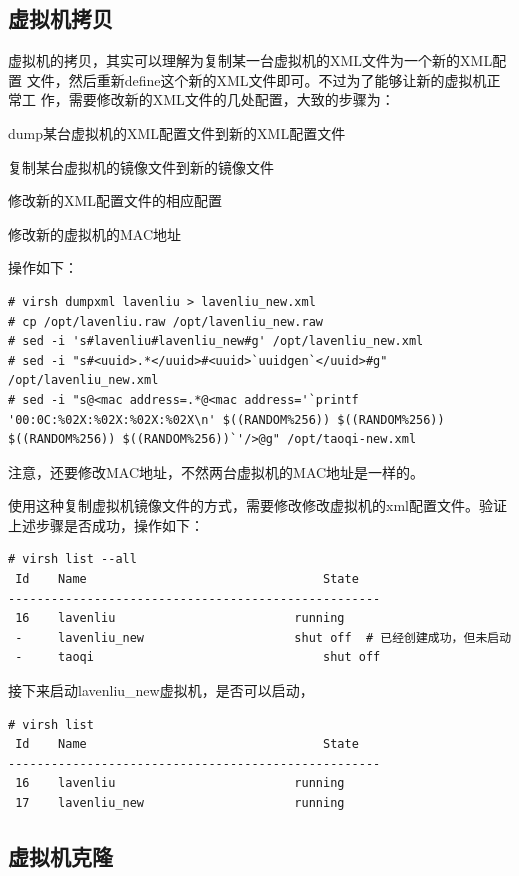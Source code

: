 \subsection{虚拟机拷贝}
\label{sec:copyVM}

虚拟机的拷贝，其实可以理解为复制某一台虚拟机的XML文件为一个新的XML配置
文件，然后重新define这个新的XML文件即可。不过为了能够让新的虚拟机正常工
作，需要修改新的XML文件的几处配置，大致的步骤为：

dump某台虚拟机的XML配置文件到新的XML配置文件

复制某台虚拟机的镜像文件到新的镜像文件

修改新的XML配置文件的相应配置

修改新的虚拟机的MAC地址

操作如下：

\begin{verbatim}
# virsh dumpxml lavenliu > lavenliu_new.xml
# cp /opt/lavenliu.raw /opt/lavenliu_new.raw
# sed -i 's#lavenliu#lavenliu_new#g' /opt/lavenliu_new.xml
# sed -i "s#<uuid>.*</uuid>#<uuid>`uuidgen`</uuid>#g" /opt/lavenliu_new.xml
# sed -i "s@<mac address=.*@<mac address='`printf '00:0C:%02X:%02X:%02X:%02X\n' $((RANDOM%256)) $((RANDOM%256)) $((RANDOM%256)) $((RANDOM%256))`'/>@g" /opt/taoqi-new.xml
\end{verbatim}

注意，还要修改MAC地址，不然两台虚拟机的MAC地址是一样的。

使用这种复制虚拟机镜像文件的方式，需要修改修改虚拟机的xml配置文件。验证上述步骤是否成功，操作如下：

\begin{verbatim}
# virsh list --all
 Id    Name                           		State
----------------------------------------------------
 16    lavenliu                       	running
 -     lavenliu_new                   	shut off  # 已经创建成功，但未启动
 -     taoqi                          		shut off
\end{verbatim}

接下来启动lavenliu\_new虚拟机，是否可以启动，

\begin{verbatim}
# virsh list 
 Id    Name                           		State
----------------------------------------------------
 16    lavenliu                       	running
 17    lavenliu_new                   	running
\end{verbatim}

\subsection{虚拟机克隆}
\label{sec:cloneVM}

